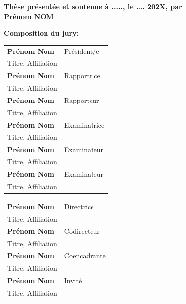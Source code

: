 \documentclass[12pt,a4paper]{book}
\begin{document}
\begin{titlepage}
\textbf{Thèse présentée et soutenue à ....., le .... 202X, par}\\
\bigskip
\Large {\color{Prune} \textbf{Prénom NOM}}


\vspace{\fill} %

\flushleft \small \textbf{Composition du jury:}
\bigskip



\scriptsize
\begin{tabular}{|p{8cm}l}
\arrayrulecolor{Prune}
\textbf{Prénom Nom} &   Président/e\\ 
Titre, Affiliation & \\
\textbf{Prénom Nom} &  Rapportrice \\ 
Titre, Affiliation   &   \\ 
\textbf{Prénom Nom} &  Rapporteur \\ 
Titre, Affiliation  &   \\ 
\textbf{Prénom Nom} &  Examinatrice \\ 
Titre, Affiliation   &   \\ 
\textbf{Prénom Nom} &  Examinateur \\ 
Titre, Affiliation   &   \\ 
\textbf{Prénom Nom} &  Examinateur \\ 
Titre, Affiliation   &   \\ 

\end{tabular} 

\medskip
\begin{tabular}{|p{8cm}l}\arrayrulecolor{white}
\textbf{Prénom Nom} &   Directrice\\ 
Titre, Affiliation & \\
\textbf{Prénom Nom} &   Codirecteur\\ 
Titre, Affiliation  &   \\ 
\textbf{Prénom Nom} &   Coencadrante\\ 
Titre, Affiliation  &   \\ 
\textbf{Prénom Nom} &  Invité \\ 
Titre, Affiliation  &   \\ 


\end{tabular} 


\end{titlepage}
\Ifthispageodd{\newpage\thispagestyle{empty}\null\newpage}{}
\thispagestyle{empty}
\selectfont
\end{document}

